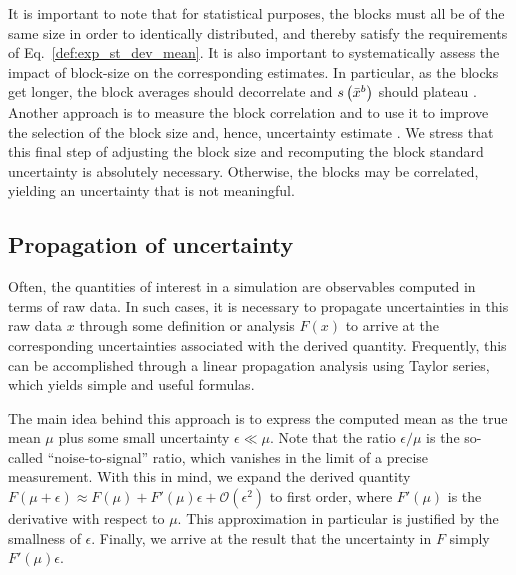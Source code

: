 It is important to note that for statistical purposes, the blocks must all be of the same size in order to identically distributed, and thereby satisfy the requirements of Eq.~\ref{def:exp_st_dev_mean}.  It is also important to  systematically assess the impact of block-size on the corresponding estimates.  In particular, as the blocks get longer, the block averages should decorrelate and $s\left( \bar{x}^b \right)$ should plateau \cite{Flyvbjerg-1989,Grossfield2009}.
Another approach is to measure the block correlation and to use it to improve the selection of the block size and, hence, uncertainty estimate \cite{Kolafa1986}.
We stress that this final step of adjusting the block size and recomputing the block standard uncertainty is absolutely necessary. Otherwise, the blocks may be correlated, yielding an uncertainty that is not meaningful.


\subsection{Propagation of uncertainty}


Often, the quantities of interest in a simulation are observables computed in terms of raw data.  In such cases, it is necessary to propagate uncertainties in this raw data $x$ through some definition or analysis $F(x)$ to arrive at the corresponding uncertainties associated with the derived quantity.  Frequently, this can be accomplished through a linear propagation analysis using Taylor series, which yields simple and useful formulas.  

The main idea behind this approach is to express the computed mean as the true mean $\mu$ plus some small uncertainty $\epsilon \ll \mu$.  Note that the ratio $\epsilon/\mu$ is the so-called ``noise-to-signal'' ratio, which vanishes in the limit of a precise measurement.  With this in mind, we expand the derived quantity $F(\mu + \epsilon)\approx F(\mu) + F'(\mu)\epsilon + \mathcal O(\epsilon^2)$ to first order, where $F'(\mu)$ is the derivative with respect to $\mu$.  This approximation in particular is justified by the smallness of $\epsilon$.  Finally, we arrive at the result that the uncertainty in $F$ simply $F'(\mu)\epsilon$.

